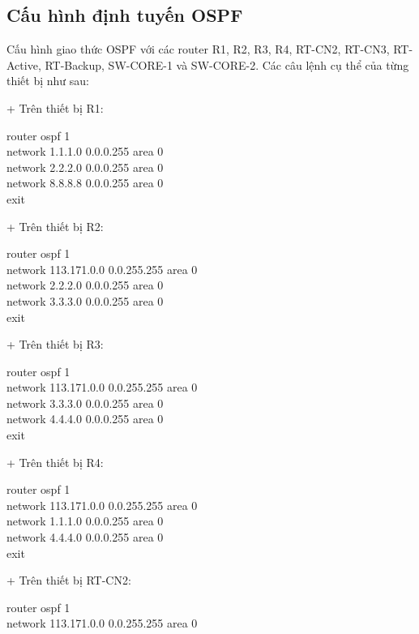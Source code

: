 \documentclass[12pt, a4paper]{article}
\begin{document}
	\subsection{Cấu hình định tuyến OSPF}
	\begin{flushleft}
		\hspace{1.55cm}Cấu hình giao thức OSPF với các router R1, R2, R3, R4, RT-CN2, RT-CN3, RT-Active, RT-Backup, SW-CORE-1 và SW-CORE-2. Các câu lệnh cụ thể của từng thiết bị như sau:\\
	\end{flushleft}
	\begin{flushleft}
		+ Trên thiết bị R1:
		\begin{tcolorbox}
			router ospf 1\\
			network 1.1.1.0 0.0.0.255 area 0\\
			network 2.2.2.0 0.0.0.255 area 0\\
			network 8.8.8.8  0.0.0.255 area 0\\
			exit
		\end{tcolorbox}
		+ Trên thiết bị R2:
		\begin{tcolorbox}
			router ospf 1\\
			network 113.171.0.0 0.0.255.255 area 0\\
			network 2.2.2.0 0.0.0.255 area 0\\
			network 3.3.3.0 0.0.0.255 area 0\\
			exit
		\end{tcolorbox}
		+ Trên thiết bị R3: 
		\begin{tcolorbox}
			router ospf 1\\
			network 113.171.0.0 0.0.255.255 area 0\\
			network 3.3.3.0 0.0.0.255 area 0\\
			network 4.4.4.0 0.0.0.255 area 0\\
			exit
		\end{tcolorbox}
		\newpage
		+ Trên thiết bị R4: 
		\begin{tcolorbox}
			router ospf 1\\
			network 113.171.0.0 0.0.255.255 area 0\\
			network 1.1.1.0 0.0.0.255 area 0\\
			network 4.4.4.0 0.0.0.255 area 0\\
			exit
		\end{tcolorbox}
		+ Trên thiết bị RT-CN2: 
		\begin{tcolorbox}
			router ospf 1 \\
			network 113.171.0.0 0.0.255.255 area 0\\

\end{tcolorbox}
\end{flushleft}
\end{document}
